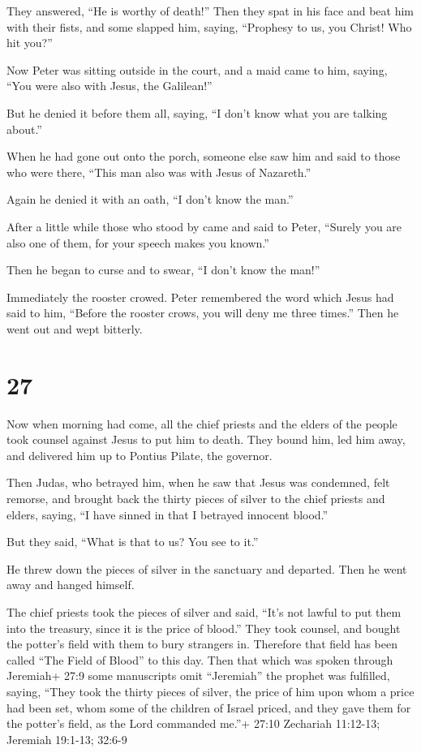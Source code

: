 They answered, ``He is worthy of death!''  Then they spat
in his face and beat him with their fists, and some slapped him,
 saying, ``Prophesy to us, you Christ! Who hit you?''

 Now Peter was sitting outside in the court, and a maid
came to him, saying, ``You were also with Jesus, the Galilean!''

 But he denied it before them all, saying, ``I don't know
what you are talking about.''

 When he had gone out onto the porch, someone else saw him
and said to those who were there, ``This man also was with Jesus of
Nazareth.''

 Again he denied it with an oath, ``I don't know the man.''

 After a little while those who stood by came and said to
Peter, ``Surely you are also one of them, for your speech makes you
known.''

 Then he began to curse and to swear, ``I don't know the
man!''

Immediately the rooster crowed.  Peter remembered the word
which Jesus had said to him, ``Before the rooster crows, you will deny
me three times.'' Then he went out and wept bitterly.

\hypertarget{section-26}{%
\section{27}\label{section-26}}

 Now when morning had come, all the chief priests and the
elders of the people took counsel against Jesus to put him to death.
 They bound him, led him away, and delivered him up to
Pontius Pilate, the governor.

 Then Judas, who betrayed him, when he saw that Jesus was
condemned, felt remorse, and brought back the thirty pieces of silver to
the chief priests and elders,  saying, ``I have sinned in
that I betrayed innocent blood.''

But they said, ``What is that to us? You see to it.''

 He threw down the pieces of silver in the sanctuary and
departed. Then he went away and hanged himself.

 The chief priests took the pieces of silver and said,
``It's not lawful to put them into the treasury, since it is the price
of blood.''  They took counsel, and bought the potter's
field with them to bury strangers in.  Therefore that field
has been called ``The Field of Blood'' to this day.  Then
that which was spoken through Jeremiah+ 27:9 some manuscripts omit
``Jeremiah'' the prophet was fulfilled, saying, ``They took the thirty
pieces of silver, the price of him upon whom a price had been set, whom
some of the children of Israel priced,  and they gave them
for the potter's field, as the Lord commanded me.''+ 27:10 Zechariah
11:12-13; Jeremiah 19:1-13; 32:6-9


